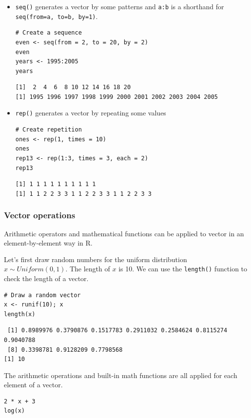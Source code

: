 \documentclass[a4paper,11pt]{article}
\begin{document}
\begin{itemize}
\item \texttt{seq()} generates a vector by some patterns and \texttt{a:b} is a shorthand
for \texttt{seq(from=a, to=b, by=1)}.

\begin{verbatim}
# Create a sequence
even <- seq(from = 2, to = 20, by = 2)
even
years <- 1995:2005
years
\end{verbatim}

\begin{verbatim}
[1]  2  4  6  8 10 12 14 16 18 20
[1] 1995 1996 1997 1998 1999 2000 2001 2002 2003 2004 2005
\end{verbatim}

\item \texttt{rep()} generates a vector by repeating some values

\begin{verbatim}
# Create repetition
ones <- rep(1, times = 10)
ones
rep13 <- rep(1:3, times = 3, each = 2)
rep13
\end{verbatim}

\begin{verbatim}
[1] 1 1 1 1 1 1 1 1 1 1
[1] 1 1 2 2 3 3 1 1 2 2 3 3 1 1 2 2 3 3
\end{verbatim}
\end{itemize}

\subsubsection*{Vector operations}
\label{sec:org0822306}

Arithmetic operators and mathematical functions can be applied to
vector in an element-by-element way in R.

Let's first draw random numbers for the uniform distribution
\(x \sim Uniform(0, 1)\). The length of \(x\) is 10. We can use the
\texttt{length()} function to check the length of a vector.

\begin{verbatim}
# Draw a random vector
x <- runif(10); x
length(x)
\end{verbatim}

\begin{verbatim}
 [1] 0.8989976 0.3790876 0.1517783 0.2911032 0.2584624 0.8115274 0.9040788
 [8] 0.3398781 0.9128209 0.7798568
[1] 10
\end{verbatim}

The arithmetic operations and built-in math functions are all applied
for each element of a vector.
\begin{verbatim}
2 * x + 3
log(x)
\end{verbatim}
\end{document}
